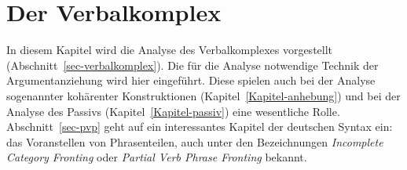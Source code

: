 

\chapter{Der Verbalkomplex}
\label{Kapitel-Verbalkomplex}



%


In diesem Kapitel wird die Analyse des Verbalkomplexes vorgestellt (Abschnitt~\ref{sec-verbalkomplex}).
Die für die Analyse notwendige Technik der Argumentanziehung wird hier eingeführt. Diese spielen
auch bei der Analyse sogenannter kohärenter Konstruktionen (Kapitel~\ref{Kapitel-anhebung}) und bei
der Analyse des Passivs (Kapitel~\ref{Kapitel-passiv}) eine wesentliche Rolle. Abschnitt~\ref{sec-pvp}
geht auf ein interessantes Kapitel der deutschen Syntax ein: das Voranstellen von Phrasenteilen,
auch unter den Bezeichnungen \emph{Incomplete Category Fronting} oder \emph{Partial Verb Phrase Fronting}
bekannt.

